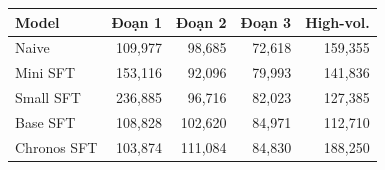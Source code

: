 \begin{tabular}{@{}lrrrr@{}}
\toprule
Model & Đoạn 1 & Đoạn 2 & Đoạn 3 & High-vol. \\
\midrule
Naive & 109,977 & 98,685 & 72,618 & 159,355 \\
Mini SFT & 153,116 & 92,096 & 79,993 & 141,836 \\
Small SFT & 236,885 & 96,716 & 82,023 & 127,385 \\
Base SFT & 108,828 & 102,620 & 84,971 & 112,710 \\
Chronos SFT & 103,874 & 111,084 & 84,830 & 188,250 \\
\bottomrule
\end{tabular}
